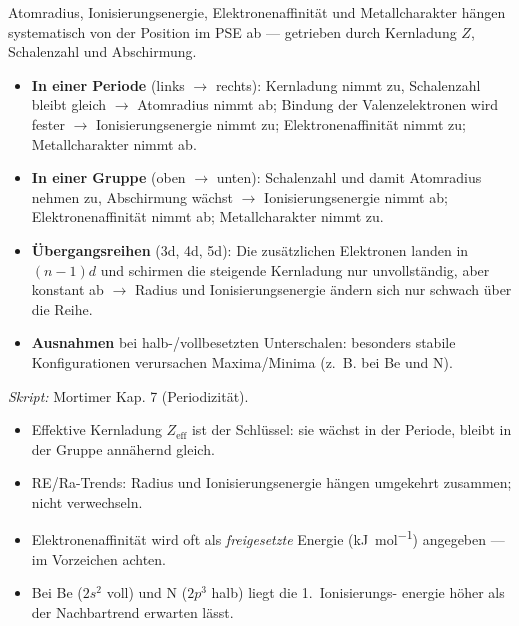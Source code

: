 
Atomradius, Ionisierungsenergie, Elektronenaffinität und Metallcharakter hängen
systematisch von der Position im PSE ab --- getrieben durch Kernladung $Z$,
Schalenzahl und Abschirmung.

\begin{werkzeugkasten}
\begin{itemize}
  \item \textbf{In einer Periode} (links $\to$ rechts): Kernladung nimmt zu,
        Schalenzahl bleibt gleich $\to$ Atomradius nimmt ab; Bindung der
        Valenzelektronen wird fester $\to$ Ionisierungsenergie nimmt zu;
        Elektronenaffinität nimmt zu; Metallcharakter nimmt ab.
  \item \textbf{In einer Gruppe} (oben $\to$ unten): Schalenzahl und damit
        Atomradius nehmen zu, Abschirmung wächst $\to$ Ionisierungsenergie
        nimmt ab; Elektronenaffinität nimmt ab; Metallcharakter nimmt zu.
  \item \textbf{Übergangsreihen} (3d, 4d, 5d): Die zusätzlichen Elektronen
        landen in $(n-1)d$ und schirmen die steigende Kernladung nur
        unvollständig, aber konstant ab $\to$ Radius und Ionisierungsenergie
        ändern sich nur schwach über die Reihe.
  \item \textbf{Ausnahmen} bei halb-/vollbesetzten Unterschalen: besonders
        stabile Konfigurationen verursachen Maxima/Minima (z.\ B. bei Be und N).
\end{itemize}
\textit{Skript:} Mortimer Kap. 7 (Periodizität).
\end{werkzeugkasten}

\begin{achtung}
\begin{itemize}
  \item Effektive Kernladung $Z_{\mathrm{eff}}$ ist der Schlüssel: sie wächst
        in der Periode, bleibt in der Gruppe annähernd gleich.
  \item RE/Ra-Trends: Radius und Ionisierungsenergie hängen umgekehrt
        zusammen; nicht verwechseln.
  \item Elektronenaffinität wird oft als \textit{freigesetzte} Energie (\si{\kilo\joule\per\mol})
        angegeben --- im Vorzeichen achten.
  \item Bei Be ($2s^2$ voll) und N ($2p^3$ halb) liegt die 1.\ Ionisierungs-
        energie höher als der Nachbartrend erwarten lässt.
\end{itemize}
\end{achtung}
